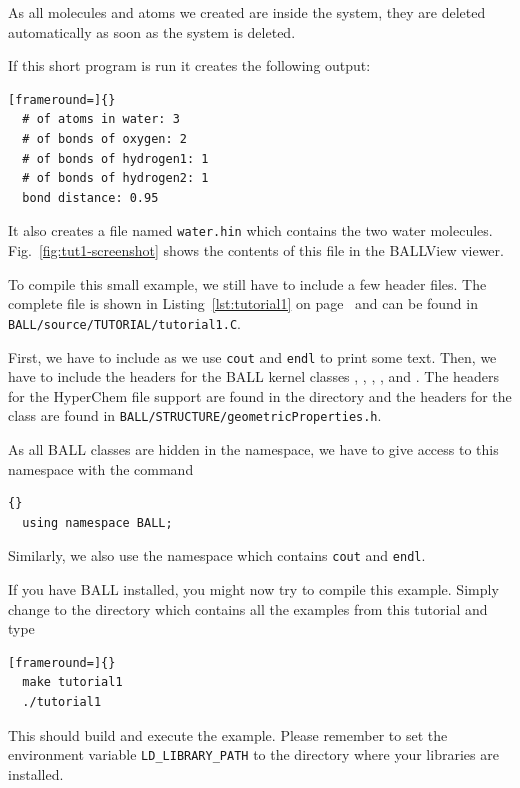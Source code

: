 % 

\noindent 
As all molecules and atoms we created are inside the system, they are deleted
automatically as soon as the system is deleted.

If this short program is run it creates the following output:

\begin{lstlisting}[frameround=]{}
  # of atoms in water: 3
  # of bonds of oxygen: 2
  # of bonds of hydrogen1: 1
  # of bonds of hydrogen2: 1
  bond distance: 0.95
\end{lstlisting}

\noindent
It also creates a file named {\tt water.hin} which contains the two water
molecules. Fig.~\ref{fig:tut1-screenshot} shows the contents of this file
in the BALLView viewer.

To compile this small example, we still have to include a few header files.
The complete file is shown in Listing~\ref{lst:tutorial1} on
page~\pageref{lst:tutorial1} and can be found in \mbox{{\tt
BALL/source/TUTORIAL/tutorial1.C}}.

First, we have to include  as we use {\tt cout} and {\tt endl}
to print some text. Then, we have to include the headers for the BALL kernel
classes , , , , and
. The headers for the HyperChem file support are found in the
directory  and the headers for the
 class are found in
{\tt BALL/STRUCTURE/geometricProperties.h}.

As all BALL classes are hidden in the  namespace, we have to
give access to this namespace with the command 
\begin{lstlisting}{}
  using namespace BALL;
\end{lstlisting}
Similarly, we also use the namespace  which contains {\tt cout}
and {\tt endl}.

If you have BALL installed, you might now try to compile this example. Simply
change to the directory  which contains all
the examples from this tutorial and type 
\begin{lstlisting}[frameround=]{}
  make tutorial1
  ./tutorial1
\end{lstlisting}
This should build and execute the example. Please remember to set the
environment variable {\tt LD\_LIBRARY\_PATH} to the directory where your
libraries are installed.

